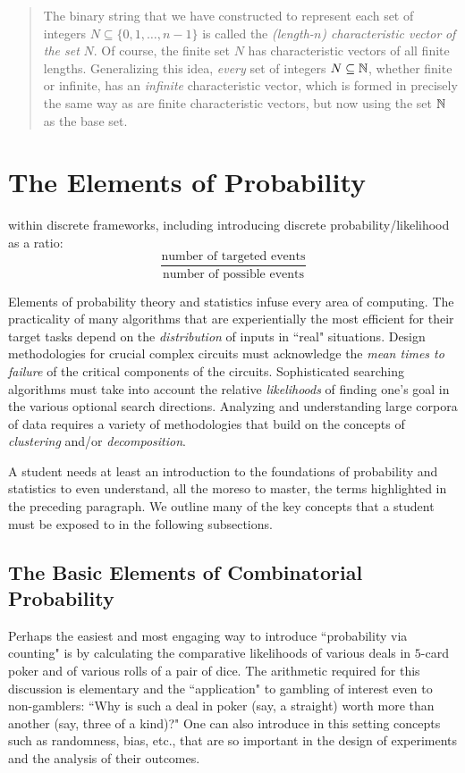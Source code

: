 \begin{quote}
The binary string that we have constructed to represent each set of
integers $N \subseteq \{0, 1, \ldots, n-1\}$ is called the {\it
(length-$n$) characteristic vector}
{\it of the set} $N$.  Of course, the finite set $N$ has
characteristic vectors of all finite lengths.  Generalizing this idea,
{\em every} set of integers $N \subseteq \mathbb{N}$, whether finite or
infinite, has an {\em infinite} characteristic vector, which is formed
in precisely the same way as are finite characteristic vectors, but
now using the set $\mathbb{N}$ as the base set.
\end{quote}


\section{The Elements of Probability}
\label{ch:prob-stat}



 within discrete frameworks, including introducing
discrete probability/likelihood as a ratio:
\[ 
\frac{\mbox{number of targeted events}}{\mbox{number of possible events}}
\]


Elements of probability theory and statistics infuse every area of
computing.  The practicality of many algorithms that are
experientially the most efficient for their target tasks depend on the
{\em distribution} of inputs in ``real" situations.  Design
methodologies for crucial complex circuits must acknowledge the {\em
  mean times to failure} of the critical components of the circuits.
Sophisticated searching algorithms must take into account the relative
{\em likelihoods} of finding one's goal in the various optional search
directions.  Analyzing and understanding large corpora of data
requires a variety of methodologies that build on the concepts of {\em
  clustering} and/or {\em decomposition}.

A student needs at least an introduction to the foundations of
probability and statistics to even understand, all the moreso to
master, the terms highlighted in the preceding paragraph.  We outline
many of the key concepts that a student must be exposed to in the
following subsections.


\subsection{The Basic Elements of Combinatorial Probability}

Perhaps the easiest and most engaging way to introduce ``probability
via counting" is by calculating the comparative likelihoods of various
deals in $5$-card poker and of various rolls of a pair of dice.  The
arithmetic required for this discussion is elementary and the
``application" to gambling of interest even to non-gamblers: ``Why is
such a deal in poker (say, a straight) worth more than another (say,
three of a kind)?"  One can also introduce in this setting concepts
such as randomness, bias, etc., that are so important in the design of
experiments and the analysis of their outcomes.

